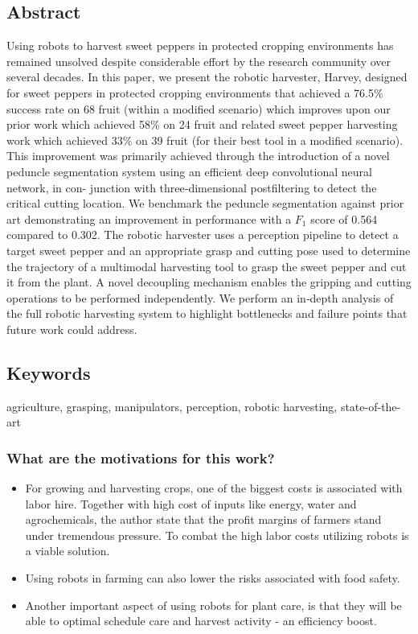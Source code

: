     \subsection*{Abstract}
    Using robots to harvest sweet peppers in protected cropping environments has
    remained unsolved despite considerable effort by the research community over
    several decades. In this paper, we present the robotic harvester, Harvey, designed
    for sweet peppers in protected cropping environments that achieved a 76.5\%
    success rate on 68 fruit (within a modified scenario) which improves upon our prior
    work which achieved 58\% on 24 fruit and related sweet pepper harvesting work
    which achieved 33\% on 39 fruit (for their best tool in a modified scenario). This
    improvement was primarily achieved through the introduction of a novel peduncle
    segmentation system using an efficient deep convolutional neural network, in con-
    junction with three‐dimensional postfiltering to detect the critical cutting location.
    We benchmark the peduncle segmentation against prior art demonstrating
    an improvement in performance with a $F_1$ score of 0.564 compared to 0.302. The
    robotic harvester uses a perception pipeline to detect a target sweet pepper and an
    appropriate grasp and cutting pose used to determine the trajectory of a multimodal
    harvesting tool to grasp the sweet pepper and cut it from the plant. A novel
    decoupling mechanism enables the gripping and cutting operations to be performed
    independently. We perform an in‐depth analysis of the full robotic harvesting system
    to highlight bottlenecks and failure points that future work could address.
    
    \subsection*{Keywords}
    agriculture, grasping, manipulators, perception, robotic harvesting, state-of-the-art
    
    
     
    \subsubsection*{What are the motivations for this work?}
    \begin{itemize}
        \item For growing and harvesting crops, one of the biggest costs is associated with labor hire. Together with high cost of inputs like energy, water and agrochemicals, the author state that the profit margins of farmers stand under tremendous pressure. To combat the high labor costs utilizing robots is a viable solution.
        \item Using robots in farming can also lower the risks associated with food safety.
        \item Another important aspect of using robots for plant care, is that they will be able to optimal schedule care and harvest activity - an efficiency boost.
    \end{itemize}
